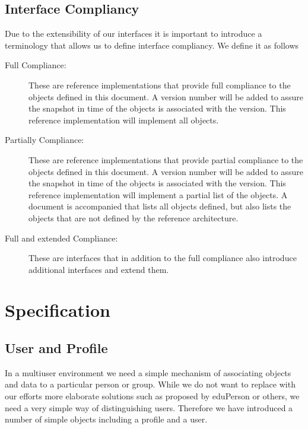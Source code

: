 \documentclass[10pt]{article}
\begin{document}
\subsection{Interface Compliancy}

Due to the extensibility of our interfaces it is important to
introduce a terminology that allows us to define interface
compliancy. We define it as follows

\begin{description}

\item[Full Compliance:] These are reference implementations that
  provide full compliance to the objects defined in this document. A
  version number will be added to assure the snapshot in time of the
  objects is associated with the version. This reference
  implementation will implement all objects.

\item[Partially Compliance:] These are reference implementations that
  provide partial compliance to the objects defined in this
  document. A version number will be added to assure the snapshot in
  time of the objects is associated with the version. This reference
  implementation will implement a partial list of the objects. A
  document is accompanied that lists all objects defined, but also
  lists the objects that are not defined by the reference
  architecture.

\item[Full and extended Compliance:] These are interfaces that in
  addition to the full compliance also introduce additional interfaces
  and extend them.

\end{description}

\section{Specification}


\subsection{User and Profile}

In a multiuser environment we need a simple mechanism of associating
objects and data to a particular person or group. While we do not want
to replace with our efforts more elaborate solutions such as proposed
by eduPerson \cite{www-eduperson} or others, we need a very simple way of distinguishing
users. Therefore we have introduced a number of simple objects
including a profile and a user.
\end{document}
